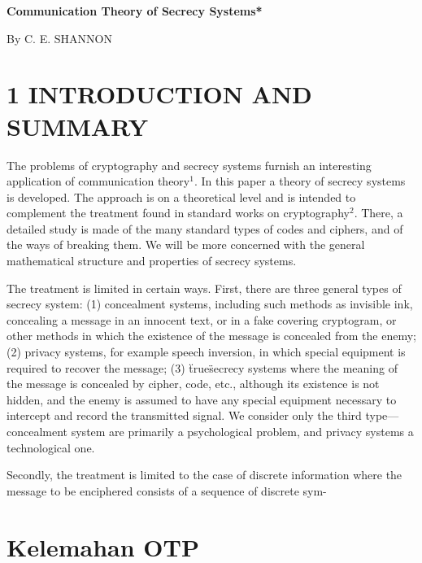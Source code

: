 \documentclass{article}
\begin{document}
\newpage


\begin{center}
\textbf{Communication Theory of Secrecy Systems*}

By C. E. SHANNON
\end{center}

\section*{1 INTRODUCTION AND SUMMARY}

The problems of cryptography and secrecy systems furnish an interesting application of communication theory$^1$. In this paper a theory of secrecy systems is developed. The approach is on a theoretical level and is intended to complement the treatment found in standard works on cryptography$^2$. There, a detailed study is made of the many standard types of codes and ciphers, and of the ways of breaking them. We will be more concerned with the general mathematical structure and properties of secrecy systems.

The treatment is limited in certain ways. First, there are three general types of secrecy system: (1) concealment systems, including such methods as invisible ink, concealing a message in an innocent text, or in a fake covering cryptogram, or other methods in which the existence of the message is concealed from the enemy; (2) privacy systems, for example speech inversion, in which special equipment is required to recover the message; (3) \"true\" secrecy systems where the meaning of the message is concealed by cipher, code, etc., although its existence is not hidden, and the enemy is assumed to have any special equipment necessary to intercept and record the transmitted signal. We consider only the third type---concealment system are primarily a psychological problem, and privacy systems a technological one.

Secondly, the treatment is limited to the case of discrete information where the message to be enciphered consists of a sequence of discrete sym-

\newpage


\section*{Kelemahan OTP}
\end{document}

